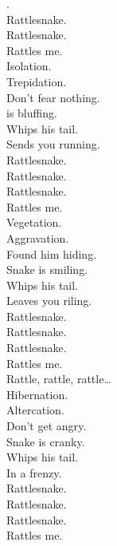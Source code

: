 
\label{album:flying-microtonal-banana}




. \\
Rattlesnake. \\
Rattlesnake. \\
Rattles me. \\

Isolation. \\
Trepidation. \\
Don't fear nothing. \\
 is bluffing. \\
Whips his tail. \\
Sends you running. \\

Rattlesnake. \\
Rattlesnake. \\
Rattlesnake. \\
Rattles me. \\

Vegetation. \\
Aggravation. \\
Found him hiding. \\
Snake is smiling. \\
Whips his tail. \\
Leaves you riling. \\

Rattlesnake. \\
Rattlesnake. \\
Rattlesnake. \\
Rattles me. \\

Rattle, rattle, rattle… \\

Hibernation. \\
Altercation. \\
Don't get angry. \\
Snake is cranky. \\
Whips his tail. \\
In a frenzy. \\

Rattlesnake. \\
Rattlesnake. \\
Rattlesnake. \\
Rattles me. \\

